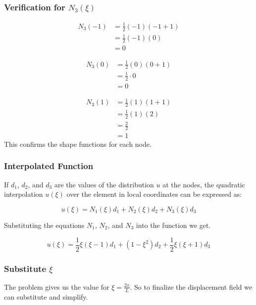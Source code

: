 \documentclass{article}
\begin{document}
\subsubsection*{Verification for \( N_3(\xi) \)}

\begin{align*}
    N_3(-1) &= \frac{1}{2}(-1)(-1 + 1) \\
            &= \frac{1}{2}(-1)(0) \\
            &= 0
\end{align*}

\begin{align*}
    N_3(0) &= \frac{1}{2}(0)(0 + 1) \\
           &= \frac{1}{2} \cdot 0 \\
           &= 0
\end{align*}

\begin{align*}
    N_3(1) &= \frac{1}{2}(1)(1 + 1) \\
           &= \frac{1}{2}(1)(2) \\
           &= \frac{2}{2} \\
           &= 1
\end{align*}
This confirms the shape functions for each node.

\subsubsection*{Interpolated Function}
If \( d_1 \), \( d_2 \), and \( d_3 \) are the values of the distribution \( u \) at the nodes, the quadratic interpolation \( u(\xi) \) over the element in local coordinates can be expressed as:

\begin{equation}
    u(\xi) = N_1(\xi) d_1 + N_2(\xi) d_2 + N_3(\xi) d_3
    \label{eq:displacement}
\end{equation}

Substituting the equations $N_1$, $N_2$, and $N_3$ into the function we get.

\begin{equation}
    u(\xi) = \frac{1}{2} \xi (\xi - 1) d_1 + (1 - \xi^2) d_2 + \frac{1}{2} \xi (\xi + 1) d_3
\end{equation}

\subsubsection*{Substitute $\xi$}
The problem gives us the value for $ \xi = \frac{2x}{L} $. So to finalize the displacement field we can substitute and simplify.
\end{document}
